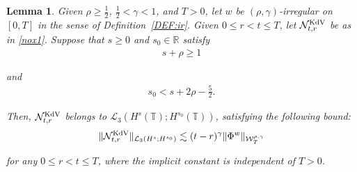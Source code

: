 \documentclass[letterpaper, 11pt,  reqno]{amsart}
\newtheorem{lemma}[theorem]{Lemma}
\newcommand{\1}{\hspace{0.5mm}\text{I}\hspace{0.5mm}}
\newcommand{\noi}{\noindent}
\newcommand{\R}{\mathbb{R}}
\newcommand{\T}{\mathbb{T}}
\renewcommand{\L}{\mathcal{L}}
\newcommand{\g}{\gamma}
\newcommand{\les}{\lesssim}
\newcommand{\NN}{\mathcal{N}}
\newcommand{\W}{\mathcal{W}}
\newcommand{\KDV}{\text{\rm KdV} }
\numberwithin{equation}{section}
\numberwithin{theorem}{section}
\begin{document}
\begin{lemma}\label{LEM:nonlin2}
Given $\rho \ge\frac 12$,  $\frac12< \g < 1$, and $T> 0$, 
let  $w$ be $(\rho,\g)$-irregular on $[0, T]$ in the sense of Definition~\ref{DEF:ir}.
Given $0 \le r < t \le T$, let $\NN^\KDV_{t, r}$
be as in \eqref{nox1}.
Suppose that $s\ge 0$ and $s_0 \in \R$ satisfy
\begin{align}
s + \rho \ge  1
\label{nox1a}
\end{align}

\noi
and 
\begin{align}
s_0 < s + 2\rho - \frac 52.
\label{nox1b}
\end{align}

\noi
Then, 
$\NN^\KDV_{t, r}$  belongs to $\L_3(H^s(\T); H^{s_0}(\T))$, 
satisfying
 the following bound\textup{:}
\begin{align}
 \|\NN^\KDV_{t, r}\|_{\L_3(H^s; H^{s_0})}
\les 
(t- r)^\g  \|\Phi^w\|_{  \W^{\rho,\g}_T}
\label{nox1c}
\end{align}

\noi
for any $0 \le r < t \le T$, 
where the implicit constant is independent of $T > 0$.


\end{lemma}





\end{document}
